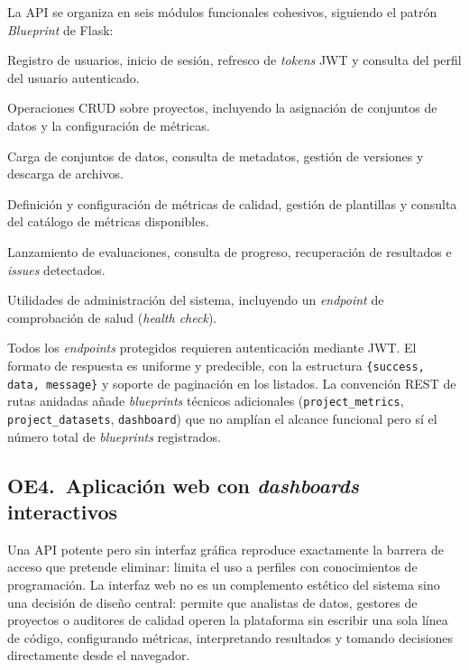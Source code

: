 La \ac{API} se organiza en seis módulos funcionales cohesivos, siguiendo el
patrón \emph{Blueprint} de Flask:

\begin{definitionlist}
  \item[\texttt{auth}] Registro de usuarios, inicio de sesión, refresco de
    \emph{tokens} \ac{JWT} y consulta del perfil del usuario autenticado.

  \item[\texttt{projects}] Operaciones \ac{CRUD} sobre proyectos, incluyendo
    la asignación de conjuntos de datos y la configuración de métricas.

  \item[\texttt{datasets}] Carga de conjuntos de datos, consulta de
    metadatos, gestión de versiones y descarga de archivos.

  \item[\texttt{metrics}] Definición y configuración de métricas de calidad,
    gestión de plantillas y consulta del catálogo de métricas disponibles.

  \item[\texttt{evaluations}] Lanzamiento de evaluaciones, consulta de
    progreso, recuperación de resultados e \emph{issues} detectados.

  \item[\texttt{admin}] Utilidades de administración del sistema, incluyendo
    un \emph{endpoint} de comprobación de salud (\emph{health check}).
\end{definitionlist}

Todos los \emph{endpoints} protegidos requieren autenticación mediante
\ac{JWT}.  El formato de respuesta es uniforme y predecible, con la estructura
\texttt{\{success, data, message\}} y soporte de paginación en los listados.
La convención REST de rutas anidadas añade \emph{blueprints} técnicos
adicionales (\texttt{project\_metrics}, \texttt{project\_datasets},
\texttt{dashboard}) que no amplían el alcance funcional pero sí el número
total de \emph{blueprints} registrados.


\subsection{OE4.\ Aplicación web con \emph{dashboards} interactivos}
\label{sec:oe4}

Una \ac{API} potente pero sin interfaz gráfica reproduce exactamente la
barrera de acceso que \dataqual pretende eliminar: limita el uso a perfiles
con conocimientos de programación.  La interfaz web no es un complemento
estético del sistema sino una decisión de diseño central: permite que analistas
de datos, gestores de proyectos o auditores de calidad operen la plataforma
sin escribir una sola línea de código, configurando métricas, interpretando
resultados y tomando decisiones directamente desde el navegador.

